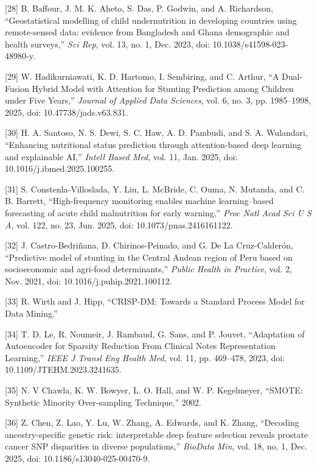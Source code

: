 \documentclass[
]{report}
\begin{document}
{[}28{]} B. Baffour, J. M. K. Aheto, S. Das, P. Godwin, and A.
Richardson, ``Geostatistical modelling of child undernutrition in
developing countries using remote-sensed data: evidence from Bangladesh
and Ghana demographic and health surveys,'' \emph{Sci Rep}, vol. 13, no.
1, Dec. 2023, doi: 10.1038/s41598-023-48980-y.

{[}29{]} W. Hadikurniawati, K. D. Hartomo, I. Sembiring, and C. Arthur,
``A Dual-Fusion Hybrid Model with Attention for Stunting Prediction
among Children under Five Years,'' \emph{Journal of Applied Data
Sciences}, vol. 6, no. 3, pp. 1985--1998, 2025, doi:
10.47738/jads.v63.831.

{[}30{]} H. A. Santoso, N. S. Dewi, S. C. Haw, A. D. Pambudi, and S. A.
Wulandari, ``Enhancing nutritional status prediction through
attention-based deep learning and explainable AI,'' \emph{Intell Based
Med}, vol. 11, Jan. 2025, doi: 10.1016/j.ibmed.2025.100255.

{[}31{]} S. Constenla-Villoslada, Y. Liu, L. McBride, C. Ouma, N.
Mutanda, and C. B. Barrett, ``High-frequency monitoring enables machine
learning--based forecasting of acute child malnutrition for early
warning,'' \emph{Proc Natl Acad Sci U S A}, vol. 122, no. 23, Jun. 2025,
doi: 10.1073/pnas.2416161122.

{[}32{]} J. Castro-Bedriñana, D. Chirinos-Peinado, and G. De La
Cruz-Calderón, ``Predictive model of stunting in the Central Andean
region of Peru based on socioeconomic and agri-food determinants,''
\emph{Public Health in Practice}, vol. 2, Nov. 2021, doi:
10.1016/j.puhip.2021.100112.

{[}33{]} R. Wirth and J. Hipp, ``CRISP-DM: Towards a Standard Process
Model for Data Mining.''

{[}34{]} T. D. Le, R. Noumeir, J. Rambaud, G. Sans, and P. Jouvet,
``Adaptation of Autoencoder for Sparsity Reduction From Clinical Notes
Representation Learning,'' \emph{IEEE J Transl Eng Health Med}, vol. 11,
pp. 469--478, 2023, doi: 10.1109/JTEHM.2023.3241635.

{[}35{]} N. V Chawla, K. W. Bowyer, L. O. Hall, and W. P. Kegelmeyer,
``SMOTE: Synthetic Minority Over-sampling Technique,'' 2002.

{[}36{]} Z. Chen, Z. Lao, Y. Lu, W. Zhang, A. Edwards, and K. Zhang,
``Decoding ancestry-specific genetic risk: interpretable deep feature
selection reveals prostate cancer SNP disparities in diverse
populations,'' \emph{BioData Min}, vol. 18, no. 1, Dec. 2025, doi:
10.1186/s13040-025-00470-9.
\end{document}
